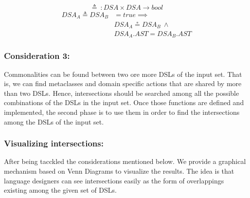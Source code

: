 \begin{itemize}
\begin{equation}
  \triangleq~: DSA \times DSA \rightarrow bool
\end{equation}
\vspace{-1mm}
\begin{equation}
\begin{split}
  DSA_{A} \triangleq DSA_{B} & = true \implies \\
   & DSA_{A} \circeq DSA_{B} ~ \wedge \\
   & DSA_{A}.AST = DSA_{B}.AST
 \end{split}
\end{equation}

\end{itemize}

\vspace{-2mm}
\subsubsection{Consideration 3:} Commonalities can be found between two ore more DSLs of the input set. That is, we can find metaclasses and domain specific actions that are shared by more than two DSLs. Hence, intersections should be searched among all the possible combinations of the DSLs in the input set. Once those functions are defined and implemented, the second phase is to use them in order to find the intersections among the DSLs of the input set. 



\vspace{-2mm}
\subsubsection{Visualizing intersections:} After being tacckled the considerations mentioned below. We provide a graphical mechanism based on Venn Diagrams to visualize the results. The idea is that language designers can see intersections easily as the form of overlappings existing among the given set of DSLs.

